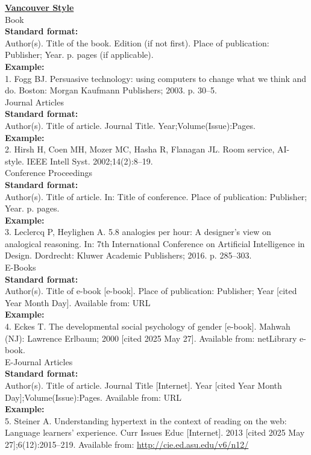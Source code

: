 \documentclass{siintec}
\begin{document}
\textbf{\underline{Vancouver Style}\\}
{\fontsize{10}{12}\selectfont
Book\\
\textbf{Standard format:}\\
Author(s). Title of the book. Edition (if not first). Place of publication: Publisher; Year. p. pages (if applicable).\\
\textbf{Example:}\\
1. Fogg BJ. Persuasive technology: using computers to change what we think and do. Boston: Morgan Kaufmann Publishers; 2003. p. 30–5.\\

Journal Articles\\
\textbf{Standard format:}\\
Author(s). Title of article. Journal Title. Year;Volume(Issue):Pages.\\
\textbf{Example:}\\
2. Hirsh H, Coen MH, Mozer MC, Hasha R, Flanagan JL. Room service, AI-style. IEEE Intell Syst. 2002;14(2):8–19.\\

Conference Proceedings\\
\textbf{Standard format:}\\
Author(s). Title of article. In: Title of conference. Place of publication: Publisher; Year. p. pages.\\
\textbf{Example:}\\
3. Leclercq P, Heylighen A. 5.8 analogies per hour: A designer's view on analogical reasoning. In: 7th International Conference on Artificial Intelligence in Design. Dordrecht: Kluwer Academic Publishers; 2016. p. 285–303.\\

E-Books\\
\textbf{Standard format:}\\
Author(s). Title of e-book [e-book]. Place of publication: Publisher; Year [cited Year Month Day]. Available from: URL\\
\textbf{Example:}\\
4. Eckes T. The developmental social psychology of gender [e-book]. Mahwah (NJ): Lawrence Erlbaum; 2000 [cited 2025 May 27]. Available from: netLibrary e-book.\\

E-Journal Articles\\
\textbf{Standard format:}\\
Author(s). Title of article. Journal Title [Internet]. Year [cited Year Month Day];Volume(Issue):Pages. Available from: URL\\
\textbf{Example:}\\
5. Steiner A. Understanding hypertext in the context of reading on the web: Language learners' experience. Curr Issues Educ [Internet]. 2013 [cited 2025 May 27];6(12):2015–219. Available from: \url{http://cie.ed.asu.edu/v6/n12/}\\

}
\end{document}
